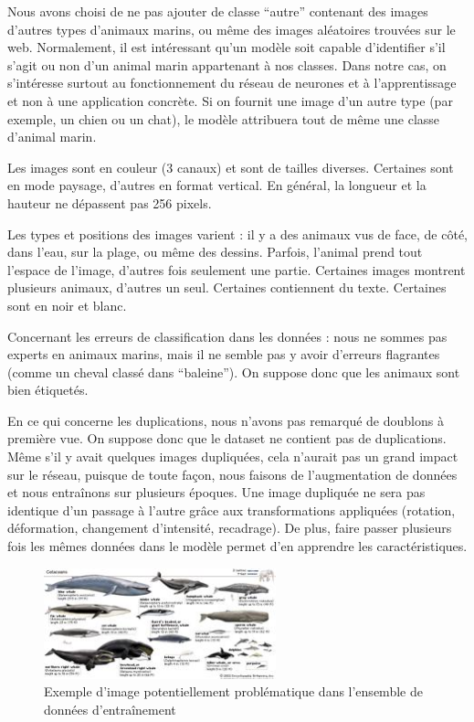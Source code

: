 \documentclass{article}
\begin{document}
Nous avons choisi de ne pas ajouter de classe ``autre'' contenant des images d'autres types d’animaux marins, ou même des images aléatoires trouvées sur le web. Normalement, il est intéressant qu’un modèle soit capable d’identifier s’il s’agit ou non d’un animal marin appartenant à nos classes.
Dans notre cas, on s’intéresse surtout au fonctionnement du réseau de neurones et à l’apprentissage et non à une application concrète. Si on fournit une image d’un autre type (par exemple, un chien ou un chat), le modèle attribuera tout de même une classe d’animal marin.

Les images sont en couleur (3 canaux) et sont de tailles diverses. Certaines sont en mode paysage, d’autres en format vertical. En général, la longueur et la hauteur ne dépassent pas 256 pixels.

Les types et positions des images varient : il y a des animaux vus de face, de côté, dans l’eau, sur la plage, ou même des dessins. Parfois, l’animal prend tout l’espace de l’image, d’autres fois seulement une partie. Certaines images montrent plusieurs animaux, d’autres un seul. Certaines contiennent du texte. Certaines sont en noir et blanc.

Concernant les erreurs de classification dans les données : nous ne sommes pas experts en animaux marins, mais il ne semble pas y avoir d’erreurs flagrantes (comme un cheval classé dans ``baleine''). On suppose donc que les animaux sont bien étiquetés.

En ce qui concerne les duplications, nous n’avons pas remarqué de doublons à première vue. On suppose donc que le dataset ne contient pas de duplications. Même s’il y avait quelques images dupliquées, cela n’aurait pas un grand impact sur le réseau, puisque de toute façon, nous faisons de l’augmentation de données et nous entraînons sur plusieurs époques.
Une image dupliquée ne sera pas identique d’un passage à l’autre grâce aux transformations appliquées (rotation, déformation, changement d’intensité, recadrage). De plus, faire passer plusieurs fois les mêmes données dans le modèle permet d’en apprendre les caractéristiques.

\begin{figure}[H]
    \centering
    \includegraphics[width=0.6\textwidth]{assets/0478.jpg}
    \caption{Exemple d'image potentiellement problématique dans l'ensemble de données d'entraînement}
\end{figure}
\end{document}

